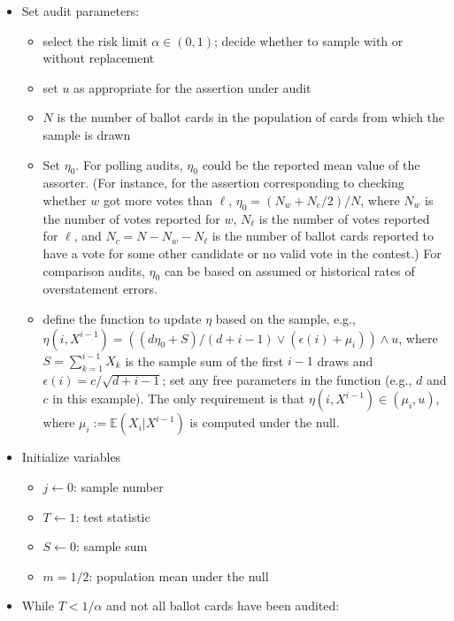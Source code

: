 \documentclass[12pt,runningheads]{llncs}
\newcommand{\EE}{\mathbb{E}}
\begin{document}
{\begin{itemize}
   \item Set audit parameters:
       \begin{itemize}
          \item select the risk limit $\alpha \in (0, 1)$; decide whether to sample with or without replacement
          \item set $u$ as appropriate for the assertion under audit
          \item $N$ is the number of ballot cards in the population of cards from which the sample is drawn
          \item Set $\eta_0$. For polling audits, $\eta_0$ could be the reported mean value of the assorter. (For instance, for the assertion corresponding
          to checking whether $w$ got more votes than $\ell$,  $\eta_0 = (N_w + N_c/2)/N$, where $N_w$ is the number of
          votes reported for $w$, $N_\ell$ is the number of votes reported for $\ell$, and $N_c = N-N_w-N_\ell$ is the number
          of ballot cards reported to have a vote for some other candidate or no valid vote in the contest.)
          For comparison audits, $\eta_0$ can be based on assumed or historical rates of overstatement errors.
          \item define the function to update $\eta$ based on the sample, e.g., \\
          $\eta(i, X^{i-1}) = \left ( (d\eta_0 + S)/(d+i-1) \vee (\epsilon(i)+ \mu_i) \right ) \wedge u$, where
          $S = \sum_{k=1}^{i-1}X_k$ is the sample sum of the first $i-1$ draws and $\epsilon(i) = c/\sqrt{d+i-1}$;
          set any free parameters in the function (e.g., $d$ and $c$ in this example).
          The only requirement is that $\eta(i, X^{i-1}) \in (\mu_i, u)$, where $\mu_i := \EE (X_i | X^{i-1})$ is computed under the null.
      \end{itemize}
    \item Initialize variables
        \begin{itemize}
          \item $j \leftarrow 0$: sample number
          \item $T \leftarrow 1$: test statistic
          \item $S \leftarrow 0$: sample sum
          \item $m = 1/2$: population mean under the null
      \end{itemize}
   \item While $T < 1/\alpha$ and not all ballot cards have been audited:

\end{itemize}}
\end{document}
